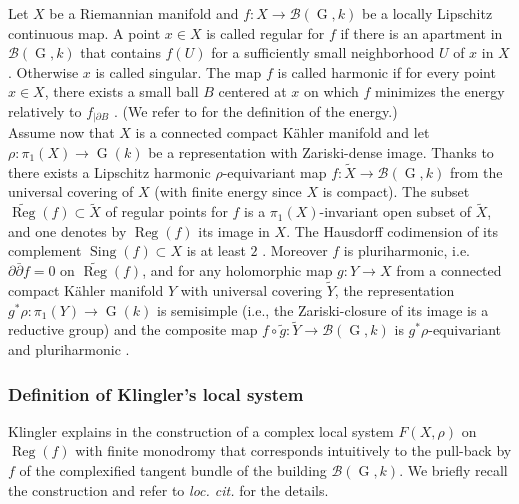 \documentclass[11pt,letterpaper]{amsart}
\theoremstyle{plain}
\DeclareMathOperator{\rG}{G}
\DeclareMathOperator{\Sing}{Sing}
\DeclareMathOperator{\Reg}{Reg}
\begin{document}
Let $X$ be a Riemannian manifold and $f \colon X \to \mathscr{B}(\rG, k)$ be a locally Lipschitz continuous map. A point $x \in X$ is called regular for $f$ if there is an apartment in $\mathscr{B}(\rG, k)$ that contains $f(U)$ for a sufficiently small neighborhood $U$ of $x$ in $X$ \cite[p.225]{Gromov-Schoen}. Otherwise $x$ is called singular. The map $f$ is called harmonic if for every point $x \in X$, there exists a small ball $B$ centered at $x$ on which $f$ minimizes the energy relatively to $f_{|\partial B}$ \cite[p.232]{Gromov-Schoen}. (We refer to \cite{Gromov-Schoen} for the definition of the energy.) \\

Assume now that $X$ is a connected compact K\"ahler manifold and let  $\rho \colon \pi_1(X) \rightarrow \rG(k)$ be a representation with Zariski-dense image. Thanks to \cite[Theorem 7.1]{Gromov-Schoen} there exists a Lipschitz harmonic $\rho$-equivariant map $f \colon \tilde{X} \to \mathscr{B}(\rG, k)$ from the universal covering of $X$ (with finite energy since $X$ is compact). The subset $\widetilde{\Reg}(f) \subset \tilde{X}$ of regular points for $f$ is a $\pi_1(X)$-invariant open subset of $\tilde{X}$, and one denotes by $\Reg(f)$ its image in $X$. The Hausdorff codimension of its complement $\Sing(f) \subset X$ is at least $2$ \cite[Theorem 6.4]{Gromov-Schoen}. Moreover $f$ is pluriharmonic, i.e. $\partial \bar \partial f = 0$ on $\widetilde{\Reg}(f)$\cite[Theorem 7.3]{Gromov-Schoen}, and for any holomorphic map $g\colon Y \to X$ from a connected compact K\"ahler manifold $Y$ with universal covering $\tilde{Y}$, the representation $g^\ast \rho \colon \pi_1(Y) \rightarrow \rG(k)$ is semisimple (i.e., the Zariski-closure of its image is a reductive group) \cite{Corlette_JDG} and the composite map $f \circ \tilde{g} \colon \tilde{Y} \to \mathscr{B}(\rG, k)$ is $g^\ast \rho $-equivariant and pluriharmonic \cite[Corollaire 1.3.8]{Eyssidieux-reductive}.

\subsubsection{Definition of Klingler's local system}
Klingler explains in \cite[section 2.2.2]{Klingler2003} the construction of a complex local system $F(X, \rho)$ on $\Reg(f)$ with finite monodromy that corresponds intuitively to the pull-back by $f$ of the complexified tangent bundle of the building $\mathscr{B}(\rG, k)$. We briefly recall the construction and refer to \textit{loc. cit.} for the details.\\
\end{document}

